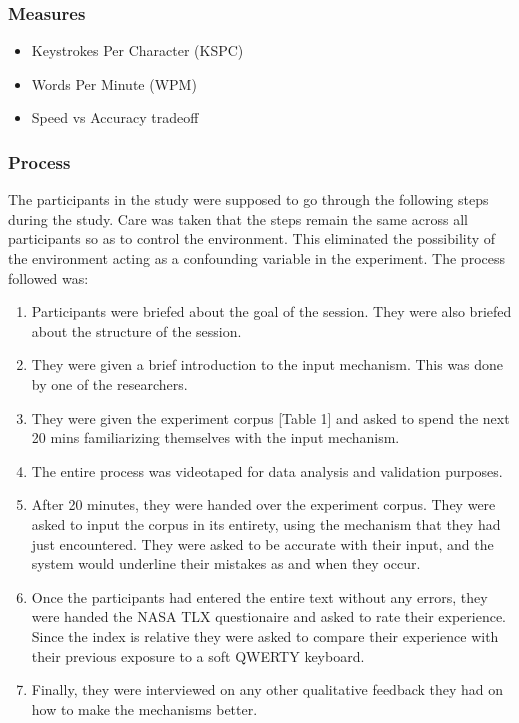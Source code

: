 \begin{itemize}
\end{itemize}
\subsubsection{Measures}
\begin{itemize}
	\item Keystrokes Per Character (KSPC)
	\item Words Per Minute (WPM)
	\item Speed vs Accuracy tradeoff 
\end{itemize}
\subsubsection{Process}

The participants in the study were supposed to go through the
following steps during the study. Care was taken that the steps remain
the same across all participants so as to control the
environment. This eliminated the
possibility of the environment acting as a confounding variable in the
experiment. The process followed was:

\begin{enumerate}
\item Participants were briefed about the goal of the session. They
  were also briefed about the structure of the session.
\item They were given a brief introduction to the input
  mechanism. This was done by one of the researchers.
\item They were given the experiment corpus [Table 1] and asked to spend the next 20
  mins familiarizing themselves with the input mechanism.
\item The entire process was videotaped for data analysis and
  validation purposes.
\item After 20 minutes, they were handed over the experiment
  corpus. They were asked to input the corpus in its entirety, using
  the mechanism that they had just encountered. They were asked to be
  accurate with their input, and the system would underline their
  mistakes as and when they occur.
\item Once the participants had entered the entire text without any
  errors, they were handed the NASA TLX questionaire and asked to rate
  their experience. Since the index is relative they were asked to
  compare their experience with their previous exposure to a soft
  QWERTY keyboard. 
\item Finally, they were interviewed on any other qualitative feedback
  they had on how to make the mechanisms better.
\end{enumerate}
	
